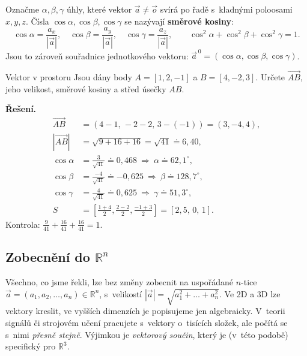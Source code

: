 \documentclass[a4paper,11pt]{article}
\newcommand{\R}{\mathbb{R}}
\newcommand{\abs}[1]{\left\lvert #1\right\rvert}
\newcommand{\dc}{{,}}                    %
\begin{document}
Označme $\alpha,\beta,\gamma$ úhly, které vektor $\vec a\neq\vec o$ svírá po řadě
s~kladnými poloosami $x,y,z$. Čísla $\cos\alpha,\cos\beta,\cos\gamma$ se nazývají
\textbf{směrové kosiny}:
\begin{equation}
  \cos\alpha=\frac{a_x}{\abs{\vec a}},\quad
  \cos\beta=\frac{a_y}{\abs{\vec a}},\quad
  \cos\gamma=\frac{a_z}{\abs{\vec a}},\qquad
  \cos^2\alpha+\cos^2\beta+\cos^2\gamma=1 .
\end{equation}
Jsou to zároveň souřadnice jednotkového vektoru:
$\vec a^{\,0}=(\cos\alpha,\cos\beta,\cos\gamma)$.

\begin{priklad}{Vektor v prostoru}
Jsou dány body $A=[1,2,-1]$ a $B=[4,-2,3]$. Určete $\overrightarrow{AB}$, jeho velikost,
směrové kosiny a střed úsečky $AB$.

\medskip\noindent\textbf{Řešení.}
\begin{align*}
  \overrightarrow{AB}&=(4-1,\,-2-2,\,3-(-1))=(3,-4,4),\\
  \abs{\overrightarrow{AB}}&=\sqrt{9+16+16}=\sqrt{41}\doteq6\dc40,\\
  \cos\alpha&=\tfrac{3}{\sqrt{41}}\doteq0\dc468\ \Rightarrow\ \alpha\doteq62\dc1^\circ,\\
  \cos\beta&=\tfrac{-4}{\sqrt{41}}\doteq-0\dc625\ \Rightarrow\ \beta\doteq128\dc7^\circ,\\
  \cos\gamma&=\tfrac{4}{\sqrt{41}}\doteq0\dc625\ \Rightarrow\ \gamma\doteq51\dc3^\circ,\\
  S&=\left[\tfrac{1+4}{2},\tfrac{2-2}{2},\tfrac{-1+3}{2}\right]=[2\dc5,\,0,\,1].
\end{align*}
Kontrola: $\tfrac{9}{41}+\tfrac{16}{41}+\tfrac{16}{41}=1$. \checkmark
\end{priklad}

\subsection{Zobecnění do \texorpdfstring{$\R^n$}{R\textasciicircum n}}

Všechno, co jsme řekli, lze bez změny zobecnit na uspořádané $n$-tice
$\vec a=(a_1,a_2,\dots,a_n)\in\R^n$, s~velikostí
$\abs{\vec a}=\sqrt{a_1^2+\dots+a_n^2}$. Ve 2D a 3D lze vektory kreslit, ve vyšších
dimenzích je popisujeme jen algebraicky. V~teorii signálů či strojovém učení
pracujete s~vektory o~tisících složek, ale počítá se s~nimi \emph{přesně stejně}.
Výjimkou je \emph{vektorový součin}, který je (v~této podobě) specifický pro $\R^3$.
\end{document}
